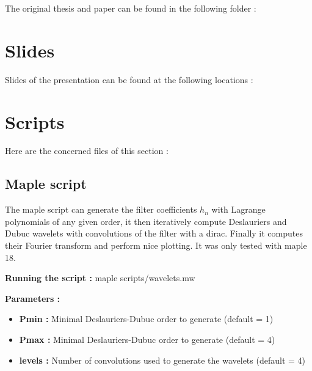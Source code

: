 The original thesis and paper can be found in the following folder :

\vskip 0.3cm


\section{Slides}

Slides of the presentation can be found at the following locations :
\vskip 0.3cm


\section{Scripts}

Here are the concerned files of this section :



\clearpage
\subsection{Maple script}

The maple script can generate the filter coefficients $h_n$ with Lagrange polynomials of any given order, it then iteratively compute Deslauriers and Dubuc wavelets with convolutions of the filter with a dirac. Finally it computes their Fourier transform and perform nice plotting. It was only tested with maple 18.

\vskip 0.3cm
{\large \textbf{Running the script :}} \textrm{\tild maple scripts/wavelets.mw}

\vskip 0.3cm
{\large \textbf{Parameters :}}
\begin{itemize}
    \item \textbf{Pmin :} Minimal Deslauriers-Dubuc order to generate (default = 1)
    \item \textbf{Pmax :} Minimal Deslauriers-Dubuc order to generate (default = 4)
    \item \textbf{levels :} Number of convolutions used to generate the wavelets (default = 4)
\end{itemize}


